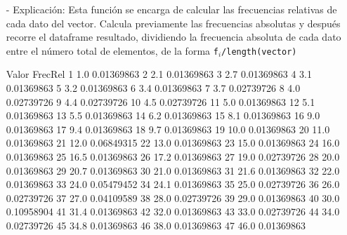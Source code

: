 \documentclass[a4paper, 12pt]{article}
\begin{document}
\begin{itemize}
\begin{itemize}
			\item[-] Explicación: Esta función se encarga de calcular las frecuencias relativas de cada dato del vector. Calcula previamente las frecuencias absolutas y después recorre el dataframe resultado, dividiendo la frecuencia absoluta de cada dato entre el número total de elementos, de la forma \texttt{f$_{i}$/length(vector)}
\begin{Schunk}
\begin{Soutput}
   Valor    FrecRel
1    1.0 0.01369863
2    2.1 0.01369863
3    2.7 0.01369863
4    3.1 0.01369863
5    3.2 0.01369863
6    3.4 0.01369863
7    3.7 0.02739726
8    4.0 0.02739726
9    4.4 0.02739726
10   4.5 0.02739726
11   5.0 0.01369863
12   5.1 0.01369863
13   5.5 0.01369863
14   6.2 0.01369863
15   8.1 0.01369863
16   9.0 0.01369863
17   9.4 0.01369863
18   9.7 0.01369863
19  10.0 0.01369863
20  11.0 0.01369863
21  12.0 0.06849315
22  13.0 0.01369863
23  15.0 0.01369863
24  16.0 0.01369863
25  16.5 0.01369863
26  17.2 0.01369863
27  19.0 0.02739726
28  20.0 0.01369863
29  20.7 0.01369863
30  21.0 0.01369863
31  21.6 0.01369863
32  22.0 0.01369863
33  24.0 0.05479452
34  24.1 0.01369863
35  25.0 0.02739726
36  26.0 0.02739726
37  27.0 0.04109589
38  28.0 0.02739726
39  29.0 0.01369863
40  30.0 0.10958904
41  31.4 0.01369863
42  32.0 0.01369863
43  33.0 0.02739726
44  34.0 0.02739726
45  34.8 0.01369863
46  38.0 0.01369863
47  46.0 0.01369863
\end{Soutput}
\end{Schunk}
		\end{itemize}
		

\end{itemize}
\end{document}
